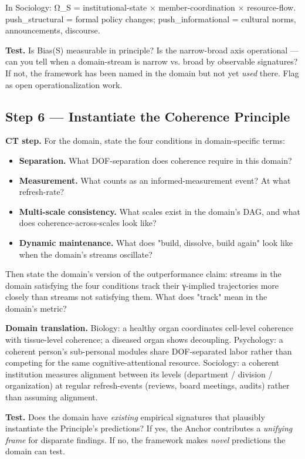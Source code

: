 \documentclass[11pt, openany]{book}
\begin{document}
In Sociology: Ω\_\allowbreak{}S = institutional-state × member-coordination × resource-flow. push\_\allowbreak{}structural = formal policy changes; push\_\allowbreak{}informational = cultural norms, announcements, discourse.

\textbf{Test.} Is Bias(S) measurable in principle? Is the narrow-broad axis operational --- can you tell when a domain-stream is narrow vs. broad by observable signatures? If not, the framework has been named in the domain but not yet \textit{used} there. Flag as open operationalization work.

\subsection{Step 6 --- Instantiate the Coherence Principle}

\textbf{CT step.} For the domain, state the four conditions in domain-specific terms:

\begin{itemize}
\item \textbf{Separation.} What DOF-separation does coherence require in this domain?
\item \textbf{Measurement.} What counts as an informed-measurement event? At what refresh-rate?
\item \textbf{Multi-scale consistency.} What scales exist in the domain's DAG, and what does coherence-across-scales look like?
\item \textbf{Dynamic maintenance.} What does "build, dissolve, build again" look like when the domain's streams oscillate?
\end{itemize}

Then state the domain's version of the outperformance claim: streams in the domain satisfying the four conditions track their γ-implied trajectories more closely than streams not satisfying them. What does "track" mean in the domain's metric?

\textbf{Domain translation.} Biology: a healthy organ coordinates cell-level coherence with tissue-level coherence; a diseased organ shows decoupling. Psychology: a coherent person's sub-personal modules share DOF-separated labor rather than competing for the same cognitive-attentional resource. Sociology: a coherent institution measures alignment between its levels (department / division / organization) at regular refresh-events (reviews, board meetings, audits) rather than assuming alignment.

\textbf{Test.} Does the domain have \textit{existing} empirical signatures that plausibly instantiate the Principle's predictions? If yes, the Anchor contributes a \textit{unifying frame} for disparate findings. If no, the framework makes \textit{novel} predictions the domain can test.
\end{document}
